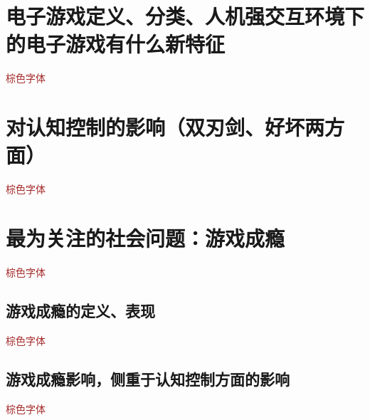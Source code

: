 \section{电子游戏定义、分类、人机强交互环境下的电子游戏有什么新特征  }
\textcolor{brown}{棕色字体}


\section{对认知控制的影响（双刃剑、好坏两方面） }

\textcolor{brown}{棕色字体}

\section{最为关注的社会问题：游戏成瘾  }

\textcolor{brown}{棕色字体}

\subsection{游戏成瘾的定义、表现}

\textcolor{brown}{棕色字体}

\subsection{游戏成瘾影响，侧重于认知控制方面的影响}

\textcolor{brown}{棕色字体}